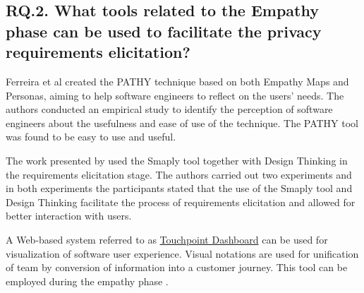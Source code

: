 \documentclass[conference]{IEEEtran}
\begin{document}
\subsection{RQ.2. What tools related to the Empathy phase can be used to facilitate the privacy requirements elicitation?}



Ferreira et al \cite{DBLP:conf/hci/FerreiraBC16} created the PATHY technique based on both Empathy Maps and Personas, aiming to help software engineers to reflect on the users' needs. The authors conducted an empirical study to identify the perception of software engineers about the usefulness and ease of use of the technique. The PATHY tool was found to be easy to use and useful.


The work presented by \cite{DBLP:conf/hci/ChasanidouGL15} used the Smaply tool together with Design Thinking in the requirements elicitation stage. The authors carried out two experiments and in both experiments the participants stated that the use of the Smaply tool and Design Thinking facilitate the process of requirements elicitation and allowed for better interaction with users.

A Web-based system referred to as \href{www.touchpointdashboard.com}{Touchpoint Dashboard} can be used for visualization of software user experience. Visual notations are used for unification of team by conversion of information into a customer journey.  This tool can be employed during the empathy phase \cite{kumar2020methods}.

\end{document}
